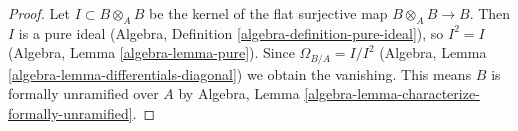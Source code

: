 \documentclass[10pt,a4paper]{amsart}
\theoremstyle{plain}
\theoremstyle{definition}
\theoremstyle{remark}
\numberwithin{equation}{subsection}
\begin{document}
\begin{proof}
Let $I \subset B \otimes_A B$ be the kernel of the flat surjective map
$B \otimes_A B \to B$. Then $I$ is a pure ideal
(Algebra, Definition \ref{algebra-definition-pure-ideal}),
so $I^2 = I$ (Algebra, Lemma \ref{algebra-lemma-pure}).
Since $\Omega_{B/A} = I/I^2$
(Algebra, Lemma \ref{algebra-lemma-differentials-diagonal})
we obtain the vanishing. This means $B$ is formally unramified over
$A$ by
Algebra, Lemma \ref{algebra-lemma-characterize-formally-unramified}.
\end{proof}
\end{document}
